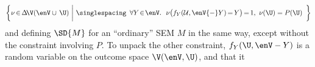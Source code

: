 \[
    \bigg\{
       \nu {\,\in\,} \Delta\!\V(\enV \cup \, \U)
            ~\bigg|~
        {\singlespacing
        \begin{array}{l}
            \forall Y \!\in\! \enV.~~
            \nu\big( f_Y(\mathcal U,
                \enV {-} Y
            ) \,{=}\, Y
            \big) \,{=}\, 1
            ,
            ~
            \nu(\U) = P(\U)
        \end{array}}
        \bigg\}
\]
and defining $\SD{M}$ for an ``ordinary'' SEM $M$ in the same way,
    except without the constraint involving $P$.
To unpack the other constraint,
$f_{Y}(\U, \enV - Y)$
is a random variable
on the outcome space $\V(\enV,\U)$,
and that it
